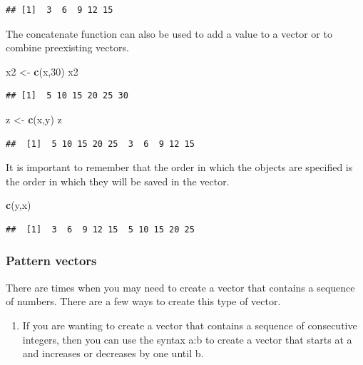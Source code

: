 \documentclass[
]{book}
\newenvironment{Shaded}{\begin{snugshade}}{\end{snugshade}}
\newcommand{\DecValTok}[1]{\textcolor[rgb]{0.00,0.00,0.81}{#1}}
\newcommand{\FunctionTok}[1]{\textcolor[rgb]{0.13,0.29,0.53}{\textbf{#1}}}
\newcommand{\NormalTok}[1]{#1}
\newcommand{\OtherTok}[1]{\textcolor[rgb]{0.56,0.35,0.01}{#1}}
\providecommand{\tightlist}{%
  \setlength{\itemsep}{0pt}\setlength{\parskip}{0pt}}
\theoremstyle{definition}
\theoremstyle{definition}
\theoremstyle{definition}
\theoremstyle{definition}
\theoremstyle{remark}
\begin{document}
\begin{verbatim}
## [1]  3  6  9 12 15
\end{verbatim}

The concatenate function can also be used to add a value to a vector or to combine preexisting vectors.

\begin{Shaded}
\begin{Highlighting}[]
\NormalTok{x2 }\OtherTok{\textless{}{-}} \FunctionTok{c}\NormalTok{(x,}\DecValTok{30}\NormalTok{)}
\NormalTok{x2}
\end{Highlighting}
\end{Shaded}

\begin{verbatim}
## [1]  5 10 15 20 25 30
\end{verbatim}

\begin{Shaded}
\begin{Highlighting}[]
\NormalTok{z }\OtherTok{\textless{}{-}} \FunctionTok{c}\NormalTok{(x,y)}
\NormalTok{z}
\end{Highlighting}
\end{Shaded}

\begin{verbatim}
##  [1]  5 10 15 20 25  3  6  9 12 15
\end{verbatim}

It is important to remember that the order in which the objects are specified is the order in which they will be saved in the vector.

\begin{Shaded}
\begin{Highlighting}[]
\FunctionTok{c}\NormalTok{(y,x)}
\end{Highlighting}
\end{Shaded}

\begin{verbatim}
##  [1]  3  6  9 12 15  5 10 15 20 25
\end{verbatim}

\hypertarget{pattern-vectors}{%
\subsubsection{Pattern vectors}\label{pattern-vectors}}

There are times when you may need to create a vector that contains a sequence of numbers. There are a few ways to create this type of vector.

\begin{enumerate}
\def\labelenumi{\arabic{enumi}.}
\tightlist
\item
  If you are wanting to create a vector that contains a sequence of consecutive integers, then you can use the syntax a:b to create a vector that starts at a and increases or decreases by one until b.
\end{enumerate}
\end{document}

